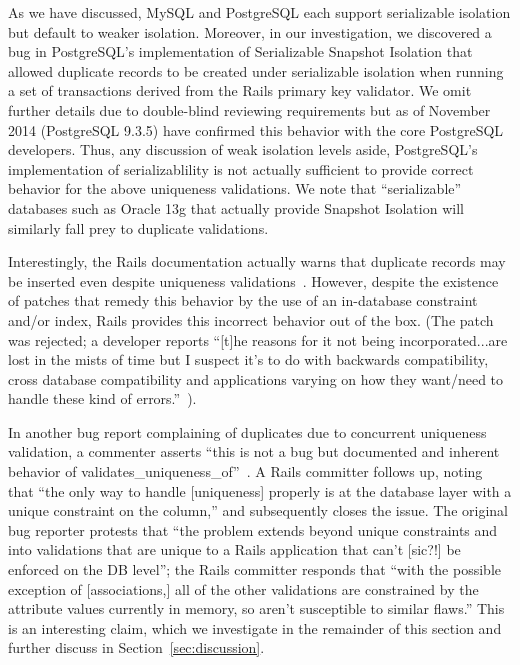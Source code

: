 As we have discussed, MySQL and PostgreSQL each support serializable
isolation but default to weaker isolation. Moreover, in our
investigation, we discovered a bug in PostgreSQL's implementation of
Serializable Snapshot Isolation that allowed duplicate records to be
created under serializable isolation when running a set of
transactions derived from the Rails primary key validator. We omit
further details due to double-blind reviewing requirements but as of
November 2014 (PostgreSQL 9.3.5) have confirmed this behavior with the
core PostgreSQL developers. Thus, any discussion of weak isolation
levels aside, PostgreSQL's implementation of serializablility is not
actually sufficient to provide correct behavior for the above
uniqueness validations. We note that ``serializable'' databases such
as Oracle 13g that actually provide Snapshot Isolation will similarly
fall prey to duplicate validations.

Interestingly, the Rails documentation actually warns that duplicate
records may be inserted even despite uniqueness
validations~\cite{rails-guide}. However, despite the existence of
patches that remedy this behavior by the use of an in-database
constraint and/or index, Rails provides this incorrect behavior out of
the box. (The patch was rejected; a developer reports ``[t]he reasons
for it not being incorporated...are lost in the mists of time but I
suspect it's to do with backwards compatibility, cross database
compatibility and applications varying on how they want/need to handle
these kind of errors.''~\cite{code-index-patch}).

In another bug report complaining of duplicates due to concurrent
uniqueness validation, a commenter asserts ``this is not a bug but
documented and inherent behavior of
validates\_uniqueness\_of''~\cite{code-index-error}.  A Rails
committer follows up, noting that ``the only way to handle
[uniqueness] properly is at the database layer with a unique
constraint on the column,'' and subsequently closes the issue. The
original bug reporter protests that ``the problem extends beyond
unique constraints and into validations that are unique to a Rails
application that can't [sic?!]  be enforced on the DB level''; the
Rails committer responds that ``with the possible exception of
[associations,] all of the other validations are constrained by the
attribute values currently in memory, so aren't susceptible to similar
flaws.'' This is an interesting claim, which we investigate in the
remainder of this section and further discuss in
Section~\ref{sec:discussion}.


